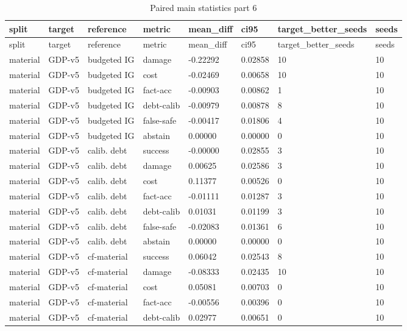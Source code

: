 \documentclass{article}
\begin{document}
\begin{center}
\tiny
\renewcommand{\arraystretch}{0.92}
\setlength{\tabcolsep}{3pt}
\begin{longtable}{llllllll}
\caption{Paired main statistics part 6}\label{tab:paired-main-statistics-6}\\
\toprule
split & target & reference & metric & mean\_diff & ci95 & target\_better\_seeds & seeds \\
\midrule
\endfirsthead
\toprule
split & target & reference & metric & mean\_diff & ci95 & target\_better\_seeds & seeds \\
\midrule
\endhead
material & GDP-v5 & budgeted IG & damage & -0.22292 & 0.02858 & 10 & 10 \\
material & GDP-v5 & budgeted IG & cost & -0.02469 & 0.00658 & 10 & 10 \\
material & GDP-v5 & budgeted IG & fact-acc & -0.00903 & 0.00862 & 1 & 10 \\
material & GDP-v5 & budgeted IG & debt-calib & -0.00979 & 0.00878 & 8 & 10 \\
material & GDP-v5 & budgeted IG & false-safe & -0.00417 & 0.01806 & 4 & 10 \\
material & GDP-v5 & budgeted IG & abstain & 0.00000 & 0.00000 & 0 & 10 \\
material & GDP-v5 & calib. debt & success & -0.00000 & 0.02855 & 3 & 10 \\
material & GDP-v5 & calib. debt & damage & 0.00625 & 0.02586 & 3 & 10 \\
material & GDP-v5 & calib. debt & cost & 0.11377 & 0.00526 & 0 & 10 \\
material & GDP-v5 & calib. debt & fact-acc & -0.01111 & 0.01287 & 3 & 10 \\
material & GDP-v5 & calib. debt & debt-calib & 0.01031 & 0.01199 & 3 & 10 \\
material & GDP-v5 & calib. debt & false-safe & -0.02083 & 0.01361 & 6 & 10 \\
material & GDP-v5 & calib. debt & abstain & 0.00000 & 0.00000 & 0 & 10 \\
material & GDP-v5 & cf-material & success & 0.06042 & 0.02543 & 8 & 10 \\
material & GDP-v5 & cf-material & damage & -0.08333 & 0.02435 & 10 & 10 \\
material & GDP-v5 & cf-material & cost & 0.05081 & 0.00703 & 0 & 10 \\
material & GDP-v5 & cf-material & fact-acc & -0.00556 & 0.00396 & 0 & 10 \\
material & GDP-v5 & cf-material & debt-calib & 0.02977 & 0.00651 & 0 & 10 \\

\end{longtable}
\end{center}
\end{document}
